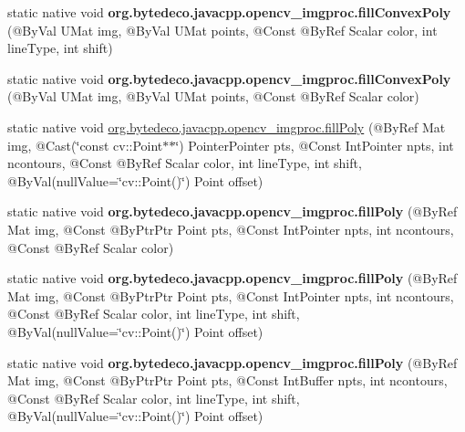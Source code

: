 \begin{DoxyCompactItemize}
static native void {\bfseries org.\+bytedeco.\+javacpp.\+opencv\+\_\+imgproc.\+fill\+Convex\+Poly} (@By\+Val U\+Mat img, @By\+Val U\+Mat points, @Const @By\+Ref Scalar color, int line\+Type, int shift)
\item 
\mbox{\label{group__imgproc__draw_ga097ccf99163a73bb60e3dd748167707c}} 
static native void {\bfseries org.\+bytedeco.\+javacpp.\+opencv\+\_\+imgproc.\+fill\+Convex\+Poly} (@By\+Val U\+Mat img, @By\+Val U\+Mat points, @Const @By\+Ref Scalar color)
\item 
static native void \hyperlink{group__imgproc__draw_ga885773572ec9b1e9c138b4656851a82a}{org.\+bytedeco.\+javacpp.\+opencv\+\_\+imgproc.\+fill\+Poly} (@By\+Ref Mat img, @Cast(\char`\"{}const cv\+::\+Point$\ast$$\ast$\char`\"{}) Pointer\+Pointer pts, @Const Int\+Pointer npts, int ncontours, @Const @By\+Ref Scalar color, int line\+Type, int shift, @By\+Val(null\+Value=\char`\"{}cv\+::\+Point()\char`\"{}) Point offset)
\item 
\mbox{\label{group__imgproc__draw_ga3f404a02bbd4d43005efc2fafc12cd2b}} 
static native void {\bfseries org.\+bytedeco.\+javacpp.\+opencv\+\_\+imgproc.\+fill\+Poly} (@By\+Ref Mat img, @Const @By\+Ptr\+Ptr Point pts, @Const Int\+Pointer npts, int ncontours, @Const @By\+Ref Scalar color)
\item 
\mbox{\label{group__imgproc__draw_ga9df35c412563323a7f67ee8472ba42d7}} 
static native void {\bfseries org.\+bytedeco.\+javacpp.\+opencv\+\_\+imgproc.\+fill\+Poly} (@By\+Ref Mat img, @Const @By\+Ptr\+Ptr Point pts, @Const Int\+Pointer npts, int ncontours, @Const @By\+Ref Scalar color, int line\+Type, int shift, @By\+Val(null\+Value=\char`\"{}cv\+::\+Point()\char`\"{}) Point offset)
\item 
\mbox{\label{group__imgproc__draw_gae7365ccf9bcc916f916cefe891b85db4}} 
static native void {\bfseries org.\+bytedeco.\+javacpp.\+opencv\+\_\+imgproc.\+fill\+Poly} (@By\+Ref Mat img, @Const @By\+Ptr\+Ptr Point pts, @Const Int\+Buffer npts, int ncontours, @Const @By\+Ref Scalar color, int line\+Type, int shift, @By\+Val(null\+Value=\char`\"{}cv\+::\+Point()\char`\"{}) Point offset)
\item 
\mbox{\label{group__imgproc__draw_ga76a2bb34fefddd6587b8b0952816e7e8}} 
$$
\end{DoxyCompactItemize}

